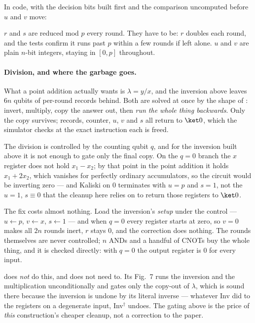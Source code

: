 \noindent
In code, with the decision bits built first and the comparison uncomputed before $u$ and $v$ move:


\noindent
$r$ and $s$ are reduced mod $p$ every round. They have to be: $r$ doubles each round, and the tests
confirm it runs past $p$ within a few rounds if left alone. $u$ and $v$ are plain $n$-bit integers,
staying in $[0,p]$ throughout.

\paragraph{Division, and where the garbage goes.}
What a point addition actually wants is $\lambda = y/x$, and the inversion above leaves $6n$ qubits
of per-round records behind. Both are solved at once by the shape of \cite{ec:rnsl17}: invert,
multiply, copy the answer out, then \emph{run the whole thing backwards}. Only the copy survives;
records, counter, $u$, $v$ and $s$ all return to $\ket0$, which the simulator checks at the exact
instruction each is freed.


\begin{warnbox}[title={A control that has to reach all the way down --- here, though not everywhere}]
The division is controlled by the counting qubit $q$, and for the inversion built above it is not
enough to gate only the final copy. On the $q=0$ branch the $x$ register does not hold $x_1-x_2$;
by that point in the point addition it holds $x_1+2x_2$, which vanishes for perfectly ordinary
accumulators, so the circuit would be inverting zero --- and Kaliski on $0$ terminates with $u=p$
and $s=1$, not the $u=1$, $s\equiv0$ that the cleanup here relies on to return those registers to
$\ket0$.

The fix costs almost nothing. Load the inversion's \emph{setup} under the control ---
$u\leftarrow p$, $v\leftarrow x$, $s\leftarrow1$ --- and when $q=0$ every register starts at zero,
so $v=0$ makes all $2n$ rounds inert, $r$ stays $0$, and the correction does nothing. The rounds
themselves are never controlled; $n$ ANDs and a handful of CNOTs buy the whole thing, and it is
checked directly: with $q=0$ the output register is $0$ for every input.

\cite{ec:kim26} does \emph{not} do this, and does not need to. Its Fig.~7 runs the inversion and
the multiplication unconditionally and gates only the copy-out of $\lambda$, which is sound there
because the inversion is undone by its literal inverse --- whatever Inv did to the registers on a
degenerate input, Inv$^\dagger$ undoes. The gating above is the price of \emph{this} construction's
cheaper cleanup, not a correction to the paper.
\end{warnbox}


